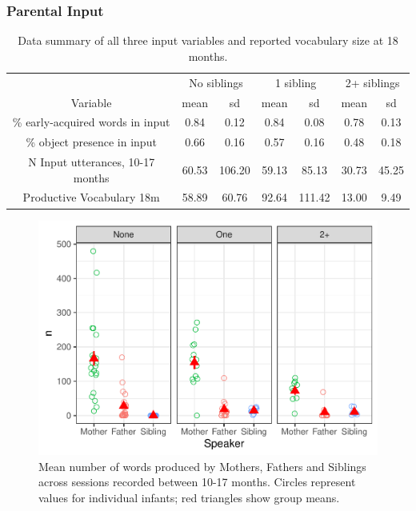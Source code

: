 \documentclass[man,floatsintext]{apa6}
\begin{document}
\hypertarget{parental-input}{%
\subsubsection{Parental Input}\label{parental-input}}

\begin{table}[t]

\caption{\label{tab:table-data-summary}Data summary of all three input variables and reported vocabulary size at 18 months.}
\centering
\begin{tabular}{ccccccc}
\toprule
\multicolumn{1}{c}{ } & \multicolumn{2}{c}{No siblings} & \multicolumn{2}{c}{1 sibling} & \multicolumn{2}{c}{2+ siblings} \\
\cmidrule(l{3pt}r{3pt}){2-3} \cmidrule(l{3pt}r{3pt}){4-5} \cmidrule(l{3pt}r{3pt}){6-7}
Variable & mean & sd & mean & sd & mean & sd\\
\midrule
\% early-acquired words in input & 0.84 & 0.12 & 0.84 & 0.08 & 0.78 & 0.13\\
\% object presence in input & 0.66 & 0.16 & 0.57 & 0.16 & 0.48 & 0.18\\
N Input utterances, 10-17 months & 60.53 & 106.20 & 59.13 & 85.13 & 30.73 & 45.25\\
Productive Vocabulary 18m & 58.89 & 60.76 & 92.64 & 111.42 & 13.00 & 9.49\\
\bottomrule
\end{tabular}
\end{table}

\begin{figure}
\centering
\includegraphics{SiblingsStudyText_files/figure-latex/Figure-Speaker-count-1.pdf}
\caption{\label{fig:Figure-Speaker-count}Mean number of words produced by Mothers, Fathers and Siblings across sessions recorded between 10-17 months. Circles represent values for individual infants; red triangles show group means.}
\end{figure}
\end{document}
